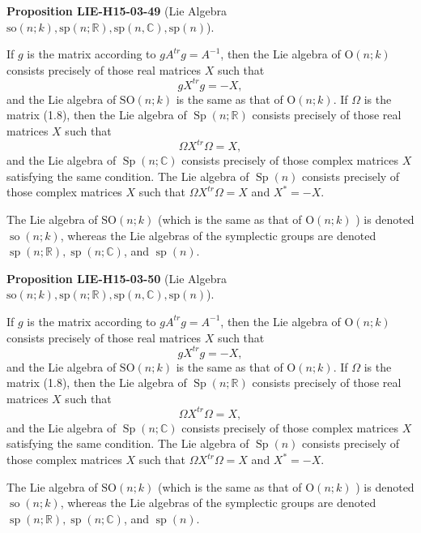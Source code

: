 \documentclass[10pt, letterpaper]{article}
\newcommand{\R}{\mathbb{R}}
\newcommand{\C}{\mathbb{C}}
\newcommand{\CustomHeading}[3]{%
  \par\medskip\noindent%
  \textbf{#1 #2} \textnormal{(#3)}.\enskip%
}
\newenvironment{PROP}[2]{\CustomHeading{Proposition}{#1}{#2}}{}
\begin{document}
\begin{PROP}{LIE-H15-03-49}{Lie Algebra $\mathrm{so}(n;k),\mathrm{sp}(n;\R),\mathrm{sp}(n,\C),\mathrm{sp}(n)$}
If $g$ is the matrix according to $g A^{t r} g=A^{-1}$, then the Lie algebra of $\mathrm{O}(n ; k)$ consists precisely of those real matrices $X$ such that
$$
g X^{t r} g=-X,
$$
and the Lie algebra of $\mathrm{SO}(n ; k)$ is the same as that of $\mathrm{O}(n ; k)$. If $\Omega$ is the matrix (1.8), then the Lie algebra of $\operatorname{Sp}(n ; \mathbb{R})$ consists precisely of those real matrices $X$ such that
$$
\Omega X^{t r} \Omega=X,
$$
and the Lie algebra of $\operatorname{Sp}(n ; \mathbb{C})$ consists precisely of those complex matrices $X$ satisfying the same condition. The Lie algebra of $\operatorname{Sp}(n)$ consists precisely of those complex matrices $X$ such that $\Omega X^{t r} \Omega=X$ and $X^{*}=-X$.

The Lie algebra of $\mathrm{SO}(n ; k)$ (which is the same as that of $\mathrm{O}(n ; k)$ ) is denoted $\operatorname{so}(n ; k)$, whereas the Lie algebras of the symplectic groups are denoted $\operatorname{sp}(n ; \mathbb{R}), \operatorname{sp}(n ; \mathbb{C})$, and $\operatorname{sp}(n)$.
\end{PROP}

\begin{PROP}{LIE-H15-03-50}{Lie Algebra $\mathrm{so}(n;k),\mathrm{sp}(n;\R),\mathrm{sp}(n,\C),\mathrm{sp}(n)$}
If $g$ is the matrix according to $g A^{t r} g=A^{-1}$, then the Lie algebra of $\mathrm{O}(n ; k)$ consists precisely of those real matrices $X$ such that
$$
g X^{t r} g=-X,
$$
and the Lie algebra of $\mathrm{SO}(n ; k)$ is the same as that of $\mathrm{O}(n ; k)$. If $\Omega$ is the matrix (1.8), then the Lie algebra of $\operatorname{Sp}(n ; \mathbb{R})$ consists precisely of those real matrices $X$ such that
$$
\Omega X^{t r} \Omega=X,
$$
and the Lie algebra of $\operatorname{Sp}(n ; \mathbb{C})$ consists precisely of those complex matrices $X$ satisfying the same condition. The Lie algebra of $\operatorname{Sp}(n)$ consists precisely of those complex matrices $X$ such that $\Omega X^{t r} \Omega=X$ and $X^{*}=-X$.

The Lie algebra of $\mathrm{SO}(n ; k)$ (which is the same as that of $\mathrm{O}(n ; k)$ ) is denoted $\operatorname{so}(n ; k)$, whereas the Lie algebras of the symplectic groups are denoted $\operatorname{sp}(n ; \mathbb{R}), \operatorname{sp}(n ; \mathbb{C})$, and $\operatorname{sp}(n)$.
\end{PROP}
\end{document}
